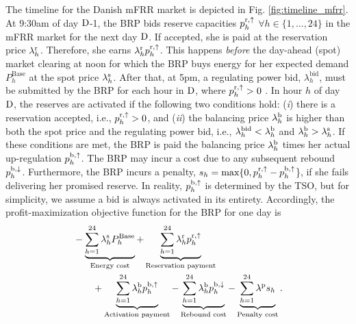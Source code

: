 The timeline for the Danish mFRR market is depicted in Fig. \ref{fig:timeline_mfrr}. At 9:30am of day $\rm{D}$-1, the BRP bids reserve capacities $p_{h}^{\rm{r},\uparrow}$ $\forall{h} \in \{1, \ldots, 24 \}$ in the mFRR market for the next day $\rm{D}$. If accepted, she is paid at the reservation price $\lambda_{h}^{\rm{r}}$. Therefore, she earns $\lambda_{h}^{\rm{r}}p_{h}^{\rm{r},\uparrow}$. This happens \textit{before} the day-ahead (spot) market clearing at noon for which the BRP buys energy for her expected demand $P_{h}^{\text{Base}}$ at the spot price $\lambda_{h}^{\rm{s}}$. After that, at 5pm, a regulating power bid, $\lambda_{h}^{\text{bid}}$, must be submitted by the BRP for each hour in $\rm{D}$, where $p_{h}^{\rm{r},\uparrow} > 0$ \cite{energinet:Systemydelser}. In hour $h$ of day $\rm{D}$, the reserves are activated if the following two conditions hold: (\textit{i}) there is a reservation accepted, i.e., $p_{h}^{\rm{r},\uparrow} > 0$, and (\textit{ii}) the balancing price $\lambda_{h}^{\rm{b}}$ is higher than both the spot price and the regulating power bid, i.e., $ \lambda_{h}^{\text{bid}} <  \lambda_{h}^{\rm{b}}$ and $ \lambda_{h}^{\rm{b}} > \lambda_{h}^{\rm{s}}$. If these conditions are met, the BRP is paid the balancing price $\lambda_{h}^{\rm{b}}$ times her actual up-regulation $p_{h}^{\rm{b},\uparrow}$. The BRP may  incur a cost due to any subsequent rebound $p_{h}^{\rm{b},\downarrow}$. Furthermore, the BRP incurs a penalty, $s_{h} = \text{max}\{0, p_{h}^{\rm{r},\uparrow} - p_{h}^{\rm{b},\uparrow}$\}, if she fails delivering her promised reserve. In reality, $p_{h}^{\rm{b},\uparrow}$ is determined by the TSO, but for simplicity, we assume a bid is always activated in its entirety.
Accordingly, the profit-maximization objective function for the BRP  for one day is 
%
\begin{align}\label{eq:mFRRObjective}
     &  - \underbrace{\sum_{h=1}^{24} \lambda^{\rm{s}}_{h}P^{\text{Base}}_{h}}_{\textrm{Energy cost}} + \underbrace{\sum_{h=1}^{24}\lambda_{h}^{\rm{r}} p^{\rm{r}, \uparrow}_{h}}_{\textrm{Reservation payment}}  \notag \\ & \quad \quad + \underbrace{\sum_{h=1}^{24}  \lambda_{h}^{\rm{b}} p^{\rm{b},\uparrow}_{h}}_{\textrm{Activation payment}} - \underbrace{\sum_{h=1}^{24}  \lambda_{h}^{\rm{b}} p^{\rm{b},\downarrow}_{h}}_{\textrm{Rebound cost}} - \underbrace{ \sum_{h=1}^{24}  \lambda^{\rm{p}}s_{h}}_{\textrm{Penalty cost}}.
\end{align}

